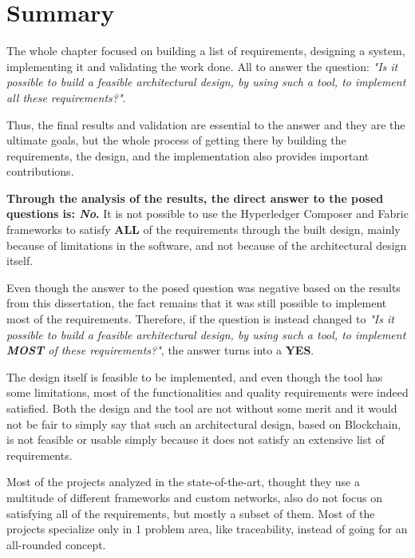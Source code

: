 \section{Summary}

The whole chapter focused on building a list of requirements, designing a system, implementing it and validating the work done. All to answer the question: \textit{"Is it possible to build a feasible architectural design, by using such a tool, to implement all these requirements?"}.

Thus, the final results and validation are essential to the answer and they are the ultimate goals, but the whole process of getting there by building the requirements, the design, and the implementation also provides important contributions.


\textbf{Through the analysis of the results, the direct answer to the posed questions is: \textit{No}.} It is not possible to use the Hyperledger Composer and Fabric frameworks to satisfy \textbf{ALL} of the requirements through the built design, mainly because of limitations in the software, and not because of the architectural design itself.

Even though the answer to the posed question was negative based on the results from this dissertation, the fact remains that it was still possible to implement most of the requirements. Therefore, if the question is instead changed to \textit{"Is it possible to build a feasible architectural design, by using such a tool, to implement \textbf{MOST} of these requirements?"}, the answer turns into a \textbf{YES}. 

The design itself is feasible to be implemented, and even though the tool has some limitations, most of the functionalities and quality requirements were indeed satisfied. Both the design and the tool are not without some merit and it would not be fair to simply say that such an architectural design, based on Blockchain, is not feasible or usable simply because it does not satisfy an extensive list of requirements.



Most of the projects analyzed in the state-of-the-art, thought they use a multitude of different frameworks and custom networks, also do not focus on satisfying all of the requirements, but mostly a subset of them. Most of the projects specialize only in 1 problem area, like traceability, instead of going for an all-rounded concept.
